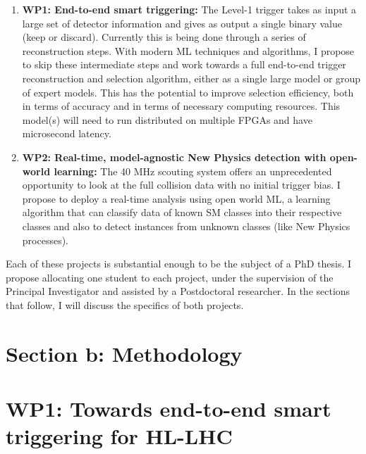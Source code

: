 \documentclass[12pt]{iopart}
\begin{document}
\begin{enumerate}
    \item \textbf{WP1: End-to-end smart triggering:} The Level-1 trigger takes as input a large set of detector information and gives as output a single binary value (keep or discard). Currently this is being done through a series of reconstruction steps. With modern ML techniques and algorithms, I propose to skip these intermediate steps and work towards a full end-to-end trigger reconstruction and selection algorithm, either as a single large model or group of expert models. This has the potential to improve selection efficiency, both in terms of accuracy and in terms of necessary computing resources. This model(s) will need to run distributed on multiple FPGAs and have microsecond latency.
    \item \textbf{WP2: Real-time, model-agnostic New Physics detection with open-world learning:} The 40 MHz scouting system offers an unprecedented opportunity to look at the full collision data with no initial trigger bias. I propose to deploy a real-time analysis using open world ML, a learning algorithm that can classify data of known SM classes into their respective classes and also to detect instances from unknown classes (like New Physics processes).
\end{enumerate}

\noindent Each of these projects is substantial enough to be the subject of a PhD thesis. I propose allocating one student to each project, under the supervision of the Principal Investigator and assisted by a Postdoctoral researcher. In the sections that follow, I will discuss the specifics of both projects.


\section{Section b: Methodology}


\section{WP1: Towards end-to-end smart triggering for HL-LHC}
\end{document}

